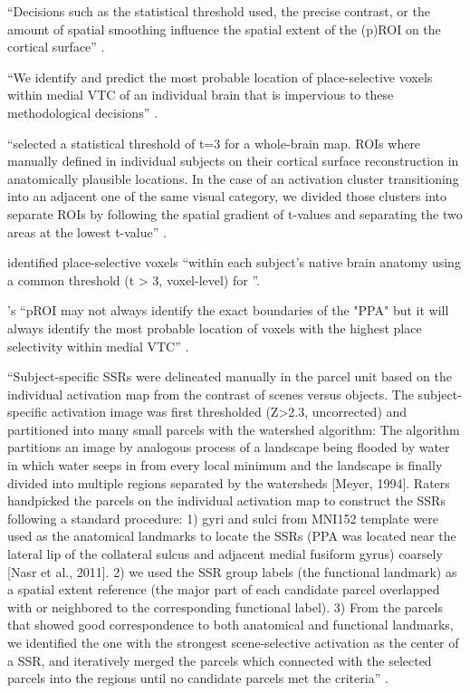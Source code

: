 ``Decisions such as the statistical threshold used, the precise contrast, or the
amount of spatial smoothing influence the spatial extent of the (p)ROI on the
cortical surface'' \citep{weiner2018defining}.

%
``We identify and predict the most probable location of place-selective voxels
within medial VTC of an individual brain that is impervious to these
methodological decisions'' \citep{weiner2018defining}.



\citet{rosenke2021probabilistic} ``selected a statistical threshold of t=3 for a
whole-brain map.
%
ROIs where manually defined in individual subjects on their cortical surface
reconstruction in anatomically plausible locations.
%
In the case of an activation cluster transitioning into an adjacent one of the
same visual category, we divided those clusters into separate ROIs by following
the spatial gradient of t-values and separating the two areas at the lowest
t-value'' \citep{rosenke2021probabilistic}.

\citet{weiner2018defining} identified place-selective voxels ``within each
subject's native brain anatomy using a common threshold (t > 3, voxel-level) for
''.

\citet{weiner2018defining}'s ``pROI may not always identify the exact boundaries
of the "PPA" but it will always identify the most probable location of voxels
with the highest place selectivity within medial VTC''
\citep{weiner2018defining}.



``Subject-specific SSRs were delineated manually in the parcel unit based on the
individual activation map from the contrast of scenes versus objects.
%
The subject-specific activation image was first thresholded (Z>2.3, uncorrected)
and partitioned into many small parcels with the watershed algorithm:
%
The algorithm partitions an image by analogous process of a landscape being
flooded by water in which water seeps in from every local minimum and the
landscape is finally divided into multiple regions separated by the watersheds
[Meyer, 1994].
%
Raters handpicked the parcels on the individual activation map to construct the
SSRs following a standard procedure:
%
1) gyri and sulci from MNI152 template were used as the anatomical landmarks to
locate the SSRs (PPA was located near the lateral lip of the collateral sulcus
and adjacent medial fusiform gyrus) coarsely [Nasr et al., 2011].
%
2) we used the SSR group labels (the functional landmark) as a spatial extent
reference (the major part of each candidate parcel overlapped with or neighbored
to the corresponding functional label).
%
3) From the parcels that showed good correspondence to both anatomical and
functional landmarks, we identified the one with the strongest scene-selective
activation as the center of a SSR, and iteratively merged the parcels which
connected with the selected parcels into the regions until no candidate parcels
met the criteria'' \citet{zhen2017quantifying}.

